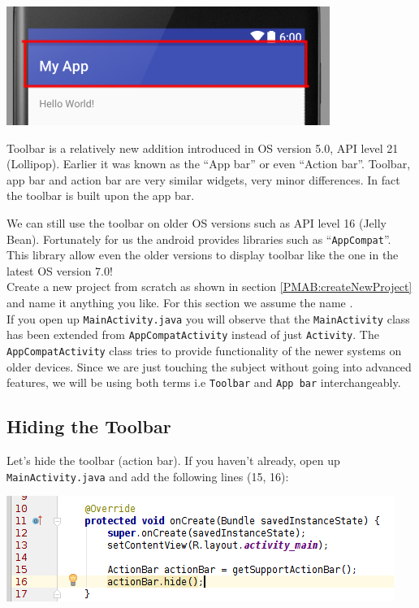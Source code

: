 \begin{center}
	\includegraphics[scale=0.4]{chapters/ch07/images/27}
\end{center}

Toolbar is a relatively new addition introduced in OS version 5.0, API level 21 (Lollipop). Earlier it was known as the ``App bar'' or even ``Action bar''. Toolbar, app bar and action bar are very similar widgets, very minor differences. In fact the toolbar is built upon the app bar. 

We can still use the toolbar on older OS versions such as API level 16 (Jelly Bean). Fortunately for us the android provides libraries such as ``\texttt{AppCompat}''. This library allow even the older versions to display toolbar like the one in the latest OS version 7.0! \\

Create a new project from scratch as shown in section \ref{PMAB:createNewProject} and name it anything you like. For this section we assume the name \texttt{}. \\

If you open up \texttt{MainActivity.java} you will observe that the \texttt{MainActivity} class has been extended from \texttt{AppCompatActivity} instead of just \texttt{Activity}. The \texttt{AppCompatActivity} class tries to provide functionality of the newer systems on older devices. Since we are just touching the subject without going into advanced features, we will be using both terms i.e \texttt{Toolbar} and \texttt{App bar} interchangeably. 

\subsection{Hiding the Toolbar}

Let's hide the toolbar (action bar). If you haven't already, open up \texttt{MainActivity.java} and add the following lines (15, 16):

\begin{center}
	\includegraphics[scale=0.4]{chapters/ch07/images/28}
\end{center}

